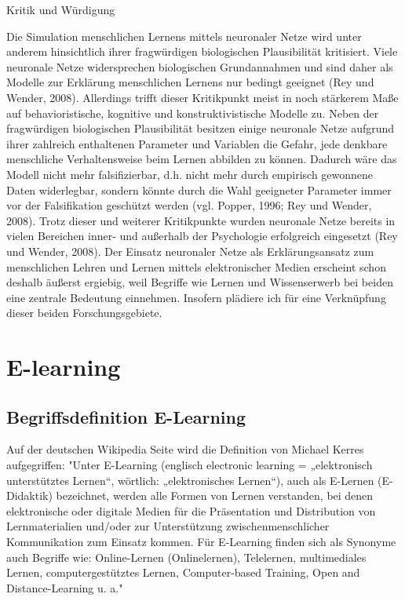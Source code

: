\documentclass[a4paper, 12pt, twoside, BCOR=20mm, DIV=calc, abstracton, parskip=half*, toc=bibliography, toc=listof, headsepline, footsepline, headings=small, numbers=enddot]{scrreprt}
\begin{document}
	Kritik und Würdigung
	
	Die Simulation menschlichen Lernens mittels neuronaler Netze wird unter anderem hinsichtlich ihrer fragwürdigen biologischen Plausibilität kritisiert. Viele neuronale Netze widersprechen biologischen Grundannahmen und sind daher als Modelle zur Erklärung menschlichen Lernens nur bedingt geeignet (Rey und Wender, 2008). Allerdings trifft dieser Kritikpunkt meist in noch stärkerem Maße auf behavioristische, kognitive und konstruktivistische Modelle zu. Neben der fragwürdigen biologischen Plausibilität besitzen einige neuronale Netze aufgrund ihrer zahlreich enthaltenen Parameter und Variablen die Gefahr, jede denkbare menschliche Verhaltensweise beim Lernen abbilden zu können. Dadurch wäre das Modell nicht mehr falsifizierbar, d.h. nicht mehr durch empirisch gewonnene Daten widerlegbar, sondern könnte durch die Wahl geeigneter Parameter immer vor der Falsifikation geschützt werden (vgl. Popper, 1996; Rey und Wender, 2008). Trotz dieser und weiterer Kritikpunkte wurden neuronale Netze bereits in vielen Bereichen inner- und außerhalb der Psychologie erfolgreich eingesetzt (Rey und Wender, 2008). Der Einsatz neuronaler Netze als Erklärungsansatz zum menschlichen Lehren und Lernen mittels elektronischer Medien erscheint schon deshalb äußerst ergiebig, weil Begriffe wie Lernen und Wissenserwerb bei beiden eine zentrale Bedeutung einnehmen. Insofern plädiere ich für eine Verknüpfung dieser beiden Forschungsgebiete.
	
	\section{E-learning}
	\subsection{Begriffsdefinition E-Learning}
	Auf der deutschen Wikipedia Seite wird die Definition von Michael Kerres aufgegriffen:
	"Unter E-Learning (englisch electronic learning = „elektronisch unterstütztes Lernen“, wörtlich: „elektronisches Lernen“), auch als E-Lernen (E-Didaktik) bezeichnet, werden alle Formen von Lernen verstanden, bei denen elektronische oder digitale Medien für die Präsentation und Distribution von Lernmaterialien und/oder zur Unterstützung zwischenmenschlicher Kommunikation zum Einsatz kommen.
	Für E-Learning finden sich als Synonyme auch Begriffe wie: Online-Lernen (Onlinelernen), Telelernen, multimediales Lernen, computergestütztes Lernen, Computer-based Training, Open and Distance-Learning u. a."\cite{kerres2005learning}
	
\end{document}
